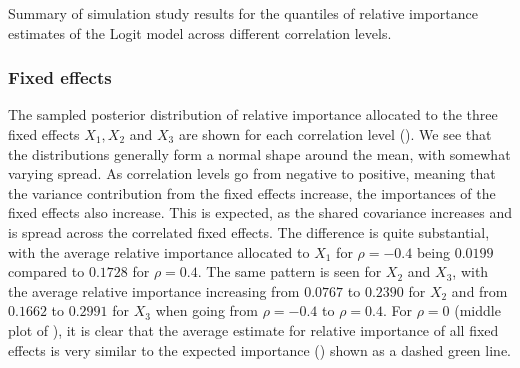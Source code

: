 \begin{table}[H]
  \caption{Summary of simulation study results for the quantiles of relative importance estimates of the Logit model across different correlation levels.}
  \label{table:summary_logit}
\end{table}
\subsubsection{Fixed effects}
The sampled posterior distribution of relative importance allocated to the three fixed effects $X_1, X_2$ and $X_3$ are shown for each correlation level (). We see that the distributions generally form a normal shape around the mean, with somewhat varying spread. As correlation levels go from negative to positive, meaning that the variance contribution from the fixed effects increase, the importances of the fixed effects also increase. This is expected, as the shared covariance increases and is spread across the correlated fixed effects. The difference is quite substantial, with the average relative importance allocated to $X_1$ for $\rho=-0.4$ being $0.0199$ compared to $0.1728$ for $\rho=0.4$. The same pattern is seen for $X_2$ and $X_3$, with the average relative importance increasing from $0.0767$ to $0.2390$ for $X_2$ and from $0.1662$ to $0.2991$ for $X_3$ when going from $\rho=-0.4$ to $\rho=0.4$. For $\rho=0$ (middle plot of ), it is clear that the average estimate for relative importance of all fixed effects is very similar to the expected importance () shown as a dashed green line. 
\\
\\
